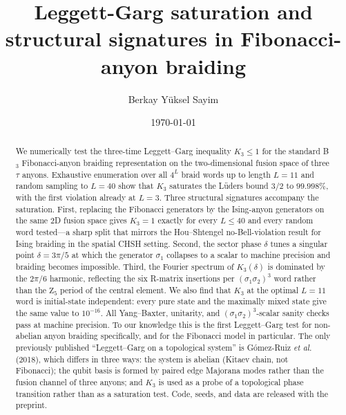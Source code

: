 \documentclass[aps,prx,reprint,amsmath,amssymb,floatfix,nofootinbib,superscriptaddress]{revtex4-2}
\begin{document}
\title{Leggett-Garg saturation and structural signatures in Fibonacci-anyon braiding}

\author{Berkay Y\"uksel Sayim}

\date{\today}

\begin{abstract}
We numerically test the three-time Leggett--Garg inequality
$K_{3} \leq 1$ for the standard B$_{3}$ Fibonacci-anyon braiding
representation on the two-dimensional fusion space of three $\tau$ anyons.
Exhaustive enumeration over all $4^{L}$ braid words up to length $L=11$
and random sampling to $L=40$ show that $K_{3}$ saturates the L\"uders
bound $3/2$ to $99.998\%$, with the first violation already at $L=3$.
Three structural signatures accompany the saturation. First, replacing
the Fibonacci generators by the Ising-anyon generators on the same
$2$D fusion space gives $K_{3}=1$ exactly for every $L \leq 40$ and every
random word tested---a sharp split that mirrors the Hou--Shtengel
no-Bell-violation result for Ising braiding in the spatial CHSH setting.
Second, the sector phase $\delta$ tunes a singular point
$\delta = 3\pi/5$ at which the generator $\sigma_{1}$ collapses to a
scalar to machine precision and braiding becomes impossible.
Third, the Fourier spectrum of $K_{3}(\delta)$ is dominated by the
$2\pi/6$ harmonic, reflecting the six R-matrix insertions per
$(\sigma_{1}\sigma_{2})^{3}$ word rather than the $\mathrm{Z}_{5}$
period of the central element. We also find that $K_{3}$
at the optimal $L=11$ word is initial-state independent: every pure
state and the maximally mixed state give the same value to $10^{-16}$.
All Yang--Baxter, unitarity, and $(\sigma_{1}\sigma_{2})^{3}$-scalar
sanity checks pass at machine precision. To our knowledge this is the
first Leggett--Garg test for non-abelian anyon braiding specifically,
and for the Fibonacci model in particular. The only previously
published ``Leggett--Garg on a topological system'' is
G\'omez-Ruiz \emph{et al.} (2018), which differs in three ways: the
system is abelian (Kitaev chain, not Fibonacci); the qubit basis is
formed by paired edge Majorana modes rather than the fusion channel
of three anyons; and $K_{3}$ is used as a probe of a topological
phase transition rather than as a saturation test. Code,
seeds, and data are released with the preprint.
\end{abstract}
\end{document}
